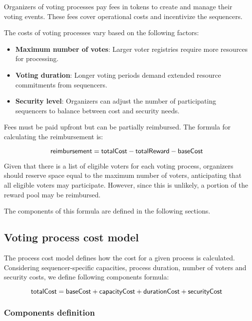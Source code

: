 Organizers of voting processes pay fees in \token tokens to create and manage their voting events. These fees cover operational costs and incentivize the sequencers.

The costs of voting processes vary based on the following factors:

\begin{itemize}
	\item \textbf{Maximum number of votes}: Larger voter registries require more resources for processing.
	\item \textbf{Voting duration}: Longer voting periods demand extended resource commitments from sequencers.
	\item \textbf{Security level}: Organizers can adjust the number of participating sequencers to balance between cost and security needs.
\end{itemize}

Fees must be paid upfront but can be partially reimbursed. The formula for calculating the reimbursement is:

$$ {\sf{reimbursement}} = {\sf{totalCost}} - {\sf{totalReward}} - {\sf{baseCost}} $$

Given that there is a list of eligible voters for each voting process, organizers should reserve space equal to the maximum number of voters, anticipating that all eligible voters may participate. However, since this is unlikely, a portion of the reward pool may be reimbursed.

The components of this formula are defined in the following sections.

\subsection{Voting process cost model}

The process cost model defines how the cost for a given process is calculated.
Considering sequencer-specific capacities, process duration, number of voters and security costs, we define following components formula:

$$ {\sf{totalCost}} = {\sf{baseCost}} + {\sf{capacityCost}} + {\sf{durationCost}} + {\sf{securityCost}} $$

\subsubsection{Components definition}

